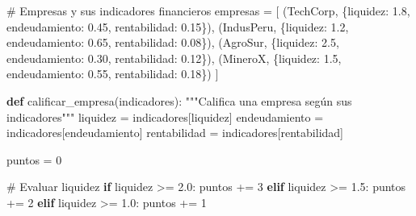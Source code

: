 \documentclass[
  doc,
  floatsintext,
  longtable,
  a4paper,
  nolmodern,
  notxfonts,
  notimes,
  12pt,
  colorlinks=true,linkcolor=blue,citecolor=blue,urlcolor=blue]{apa7}
\newenvironment{Shaded}{\begin{snugshade}}{\end{snugshade}}
\newcommand{\CommentTok}[1]{\textcolor[rgb]{0.37,0.37,0.37}{#1}}
\newcommand{\ControlFlowTok}[1]{\textcolor[rgb]{0.00,0.23,0.31}{\textbf{#1}}}
\newcommand{\DecValTok}[1]{\textcolor[rgb]{0.68,0.00,0.00}{#1}}
\newcommand{\FloatTok}[1]{\textcolor[rgb]{0.68,0.00,0.00}{#1}}
\newcommand{\KeywordTok}[1]{\textcolor[rgb]{0.00,0.23,0.31}{\textbf{#1}}}
\newcommand{\NormalTok}[1]{\textcolor[rgb]{0.00,0.23,0.31}{#1}}
\newcommand{\OperatorTok}[1]{\textcolor[rgb]{0.37,0.37,0.37}{#1}}
\newcommand{\StringTok}[1]{\textcolor[rgb]{0.13,0.47,0.30}{#1}}
\begin{document}
\begin{Shaded}
\begin{Highlighting}[]
\CommentTok{\# Empresas y sus indicadores financieros}
\NormalTok{empresas }\OperatorTok{=}\NormalTok{ [}
\NormalTok{    (}\StringTok{\textquotesingle{}TechCorp\textquotesingle{}}\NormalTok{, \{}\StringTok{\textquotesingle{}liquidez\textquotesingle{}}\NormalTok{: }\FloatTok{1.8}\NormalTok{, }\StringTok{\textquotesingle{}endeudamiento\textquotesingle{}}\NormalTok{: }\FloatTok{0.45}\NormalTok{, }\StringTok{\textquotesingle{}rentabilidad\textquotesingle{}}\NormalTok{: }\FloatTok{0.15}\NormalTok{\}),}
\NormalTok{    (}\StringTok{\textquotesingle{}IndusPeru\textquotesingle{}}\NormalTok{, \{}\StringTok{\textquotesingle{}liquidez\textquotesingle{}}\NormalTok{: }\FloatTok{1.2}\NormalTok{, }\StringTok{\textquotesingle{}endeudamiento\textquotesingle{}}\NormalTok{: }\FloatTok{0.65}\NormalTok{, }\StringTok{\textquotesingle{}rentabilidad\textquotesingle{}}\NormalTok{: }\FloatTok{0.08}\NormalTok{\}),}
\NormalTok{    (}\StringTok{\textquotesingle{}AgroSur\textquotesingle{}}\NormalTok{, \{}\StringTok{\textquotesingle{}liquidez\textquotesingle{}}\NormalTok{: }\FloatTok{2.5}\NormalTok{, }\StringTok{\textquotesingle{}endeudamiento\textquotesingle{}}\NormalTok{: }\FloatTok{0.30}\NormalTok{, }\StringTok{\textquotesingle{}rentabilidad\textquotesingle{}}\NormalTok{: }\FloatTok{0.12}\NormalTok{\}),}
\NormalTok{    (}\StringTok{\textquotesingle{}MineroX\textquotesingle{}}\NormalTok{, \{}\StringTok{\textquotesingle{}liquidez\textquotesingle{}}\NormalTok{: }\FloatTok{1.5}\NormalTok{, }\StringTok{\textquotesingle{}endeudamiento\textquotesingle{}}\NormalTok{: }\FloatTok{0.55}\NormalTok{, }\StringTok{\textquotesingle{}rentabilidad\textquotesingle{}}\NormalTok{: }\FloatTok{0.18}\NormalTok{\})}
\NormalTok{]}

\KeywordTok{def}\NormalTok{ calificar\_empresa(indicadores):}
    \CommentTok{"""Califica una empresa según sus indicadores"""}
\NormalTok{    liquidez }\OperatorTok{=}\NormalTok{ indicadores[}\StringTok{\textquotesingle{}liquidez\textquotesingle{}}\NormalTok{]}
\NormalTok{    endeudamiento }\OperatorTok{=}\NormalTok{ indicadores[}\StringTok{\textquotesingle{}endeudamiento\textquotesingle{}}\NormalTok{]}
\NormalTok{    rentabilidad }\OperatorTok{=}\NormalTok{ indicadores[}\StringTok{\textquotesingle{}rentabilidad\textquotesingle{}}\NormalTok{]}
    
\NormalTok{    puntos }\OperatorTok{=} \DecValTok{0}
    
    \CommentTok{\# Evaluar liquidez}
    \ControlFlowTok{if}\NormalTok{ liquidez }\OperatorTok{\textgreater{}=} \FloatTok{2.0}\NormalTok{:}
\NormalTok{        puntos }\OperatorTok{+=} \DecValTok{3}
    \ControlFlowTok{elif}\NormalTok{ liquidez }\OperatorTok{\textgreater{}=} \FloatTok{1.5}\NormalTok{:}
\NormalTok{        puntos }\OperatorTok{+=} \DecValTok{2}
    \ControlFlowTok{elif}\NormalTok{ liquidez }\OperatorTok{\textgreater{}=} \FloatTok{1.0}\NormalTok{:}
\NormalTok{        puntos }\OperatorTok{+=} \DecValTok{1}
    

\end{Highlighting}
\end{Shaded}
\end{document}
